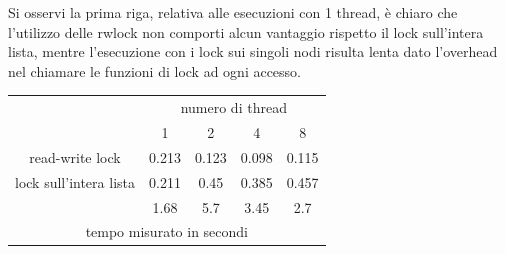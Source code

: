 \documentclass[10pt, letterpaper]{report}
\begin{document}
Si osservi la prima riga, relativa alle esecuzioni con 1 thread, è chiaro che l'utilizzo delle rwlock non comporti alcun vantaggio rispetto il lock sull'intera lista, mentre l'esecuzione con i lock sui singoli nodi risulta lenta dato l'overhead nel chiamare le funzioni di lock ad ogni accesso.\begin{center}
    \begin{tabular}{ccccc}
        \cline{2-5}
        \multicolumn{1}{c|}{}                                                & \multicolumn{4}{c|}{\cellcolor[HTML]{ECF4FF}numero di thread}                                                                                                                                               \\ \cline{2-5} 
        \multicolumn{1}{c|}{}                                                & \multicolumn{1}{c|}{\cellcolor[HTML]{ECF4FF}1}    & \multicolumn{1}{c|}{\cellcolor[HTML]{ECF4FF}2}   & \multicolumn{1}{c|}{\cellcolor[HTML]{ECF4FF}4}    & \multicolumn{1}{c|}{\cellcolor[HTML]{ECF4FF}8}   \\ \hline
        \multicolumn{1}{|c|}{\cellcolor[HTML]{FFDFB9}read-write lock}        & \multicolumn{1}{c|}{0.213}                        & \multicolumn{1}{c|}{0.123}                       & \multicolumn{1}{c|}{0.098}                        & \multicolumn{1}{c|}{0.115}                       \\ \hline
        \multicolumn{1}{|c|}{\cellcolor[HTML]{FFDFB9}lock sull'intera lista} & \multicolumn{1}{c|}{0.211}                        & \multicolumn{1}{c|}{0.45}                        & \multicolumn{1}{c|}{0.385}                        & \multicolumn{1}{c|}{0.457}                       \\ \hline
        \rowcolor[HTML]{CDFCCD} 
        \multicolumn{1}{|c|}{\cellcolor[HTML]{FFDFB9}lock sui singoli nodi}  & \multicolumn{1}{c|}{\cellcolor[HTML]{CDFCCD}1.68} & \multicolumn{1}{c|}{\cellcolor[HTML]{CDFCCD}5.7} & \multicolumn{1}{c|}{\cellcolor[HTML]{CDFCCD}3.45} & \multicolumn{1}{c|}{\cellcolor[HTML]{CDFCCD}2.7} \\ \hline
        \multicolumn{5}{c}{tempo misurato in secondi}                                                                                                                                                                                                                                     
        \end{tabular}
\end{center}
\end{document}
